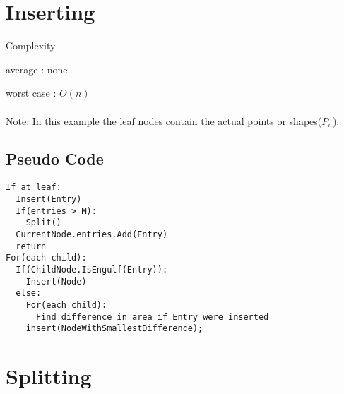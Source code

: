 \documentclass{article}
\begin{document}
\begin{multicols}{2}[]
\section{Inserting}
Complexity

average : none

worst case : $O(n)$

\paragraph{}


\begin{minipage}{\linewidth}
\centering
{}

Note: In this example the leaf nodes contain the actual points or shapes($P_n$).
\end{minipage}

\subsection*{Pseudo Code}

\begin{lstlisting}    
If at leaf:
  Insert(Entry)
  If(entries > M):
    Split()
  CurrentNode.entries.Add(Entry)
  return
For(each child):
  If(ChildNode.IsEngulf(Entry)):
    Insert(Node)
  else:
    For(each child):
      Find difference in area if Entry were inserted
    insert(NodeWithSmallestDifference);
\end{lstlisting}


\section{Splitting} 


\end{multicols}
\end{document}
